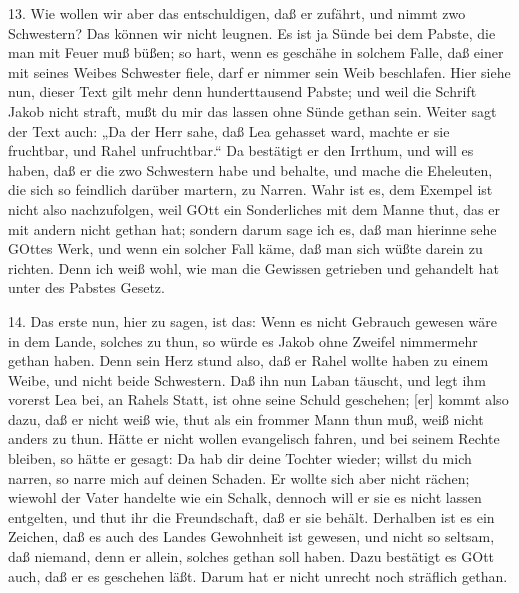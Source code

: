 13. Wie wollen wir aber das entschuldigen, daß er zufährt, und nimmt zwo Schwestern? Das können wir nicht leugnen. Es ist ja Sünde bei dem Pabste, die man mit Feuer muß büßen; so hart, wenn es geschähe in solchem Falle, daß einer mit seines Weibes Schwester fiele, darf er nimmer sein Weib beschlafen. Hier siehe nun, dieser Text gilt mehr denn hunderttausend Pabste; und weil die Schrift Jakob nicht straft, mußt du mir das lassen ohne Sünde gethan sein. Weiter sagt der Text auch: „Da der Herr sahe, daß Lea gehasset ward, machte er sie fruchtbar, und Rahel unfruchtbar.“ Da bestätigt er den Irrthum, und will es haben, daß er die zwo Schwestern habe und behalte, und mache die Eheleuten, die sich so feindlich darüber martern, zu Narren. Wahr ist es, dem Exempel ist nicht also nachzufolgen, weil GOtt ein Sonderliches mit dem Manne thut, das er mit andern nicht gethan hat; sondern darum sage ich es, daß man hierinne sehe GOttes Werk, und wenn ein solcher Fall käme, daß man sich wüßte darein zu richten. Denn ich weiß wohl, wie man die Gewissen getrieben und gehandelt hat unter des Pabstes Gesetz.

14. Das erste nun, hier zu sagen, ist das: Wenn es nicht Gebrauch gewesen wäre in dem Lande, solches zu thun, so würde es Jakob ohne Zweifel nimmermehr gethan haben. Denn sein Herz stund also, daß er Rahel wollte haben zu einem Weibe, und nicht beide Schwestern. Daß ihn nun Laban täuscht, und legt ihm vorerst Lea bei, an Rahels Statt, ist ohne seine Schuld geschehen; [er] kommt also dazu, daß er nicht weiß wie, thut als ein frommer Mann thun muß, weiß nicht anders zu thun. Hätte er nicht wollen evangelisch fahren, und bei seinem Rechte bleiben, so hätte er gesagt: Da hab dir deine
Tochter wieder; willst du mich narren, so narre mich auf deinen Schaden. Er wollte sich aber nicht rächen; wiewohl der Vater handelte wie ein Schalk, dennoch will er sie es nicht lassen entgelten, und thut ihr die Freundschaft, daß er sie behält. Derhalben ist es ein Zeichen, daß es auch des Landes Gewohnheit ist gewesen, und nicht so seltsam, daß niemand, denn er allein, solches gethan soll haben. Dazu bestätigt es GOtt auch, daß er es geschehen läßt. Darum hat er nicht unrecht noch sträflich gethan.


